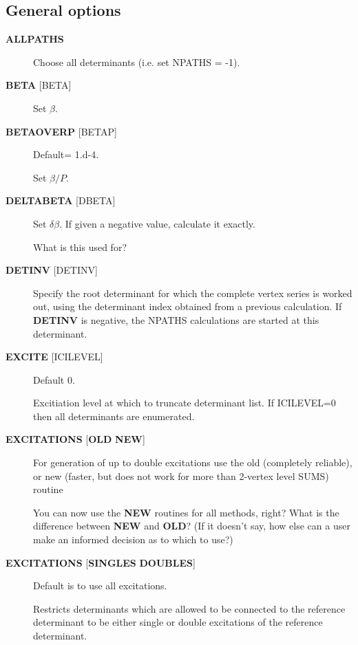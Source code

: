 \documentclass[openany,a4paper,10pt]{manual}
\begin{document}
\subsection{General options}
\begin{description}
\item[\textbf{ALLPATHS}]
Choose all determinants (i.e. set NPATHS = -1).

\item[\textbf{BETA} {[}BETA{]}]
Set $\beta$.

\item[\textbf{BETAOVERP} {[}BETAP{]}]
Default= 1.d-4.

Set $\beta/P$.

\item[\textbf{DELTABETA} {[}DBETA{]}]
Set $\delta\beta$.  If given a negative value, calculate it exactly.

\begin{notice}[note]
What is this used for?
\end{notice}

\item[\textbf{DETINV} {[}DETINV{]}]
Specify the root determinant for which the complete vertex series is
worked out, using the determinant index obtained from a previous
calculation.  If \textbf{DETINV} is negative, the NPATHS calculations
are started at this determinant.

\item[\textbf{EXCITE} {[}ICILEVEL{]}]
Default 0.

Excitiation level at which to truncate determinant list.  If ICILEVEL=0
then all determinants are enumerated.

\item[\textbf{EXCITATIONS} {[}\textbf{OLD} \textbf{NEW}{]}]
For generation of up to double excitations use the old (completely
reliable), or new (faster, but does not work for more than 2-vertex
level SUMS) routine

\begin{notice}[note]
You can now use the \textbf{NEW} routines for all methods, right?
What is the difference between \textbf{NEW} and \textbf{OLD}?  (If it doesn't say, how else
can a user make an informed decision as to which to use?)
\end{notice}

\item[\textbf{EXCITATIONS} {[}\textbf{SINGLES} \textbf{DOUBLES}{]}]
Default is to use all excitations.

Restricts determinants which are allowed to be connected to the
reference determinant to be either single or double excitations of
the reference determinant.


\end{description}
\end{document}
